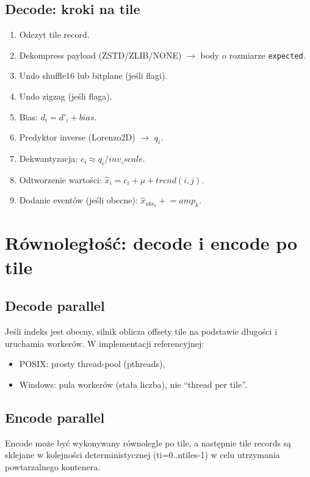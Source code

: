 \documentclass[11pt,a4paper]{article}
\begin{document}
\subsection{Decode: kroki na tile}
\begin{enumerate}
  \item Odczyt tile record.
  \item Dekompress payload (ZSTD/ZLIB/NONE) $\rightarrow$ body o rozmiarze \texttt{expected}.
  \item Undo shuffle16 lub bitplane (jeśli flagi).
  \item Undo zigzag (jeśli flaga).
  \item Bias: $d_i = d'_i + bias$.
  \item Predyktor inverse (Lorenzo2D) $\rightarrow$ $q_i$.
  \item Dekwantyzacja: $c_i \approx q_i / inv\_scale$.
  \item Odtworzenie wartości: $\hat{x}_i = c_i + \mu + trend(i,j)$.
  \item Dodanie eventów (jeśli obecne): $\hat{x}_{idx_k} \mathrel{+}= amp_k$.
\end{enumerate}

\section{Równoległość: decode i encode po tile}

\subsection{Decode parallel}
Jeśli indeks jest obecny, silnik oblicza offsety tile na podstawie długości i uruchamia workerów.
W implementacji referencyjnej:
\begin{itemize}
  \item POSIX: prosty thread-pool (pthreads),
  \item Windows: pula workerów (stała liczba), nie ``thread per tile''.
\end{itemize}

\subsection{Encode parallel}
Encode może być wykonywany równolegle po tile, a następnie tile records są sklejane w kolejności deterministycznej (ti=0..ntiles-1) w celu utrzymania powtarzalnego kontenera.

\end{document}
